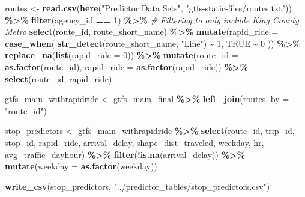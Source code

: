 \documentclass[
  12pt,
]{article}
\newenvironment{Shaded}{\begin{snugshade}}{\end{snugshade}}
\newcommand{\AttributeTok}[1]{\textcolor[rgb]{0.13,0.29,0.53}{#1}}
\newcommand{\CommentTok}[1]{\textcolor[rgb]{0.56,0.35,0.01}{\textit{#1}}}
\newcommand{\ConstantTok}[1]{\textcolor[rgb]{0.56,0.35,0.01}{#1}}
\newcommand{\DecValTok}[1]{\textcolor[rgb]{0.00,0.00,0.81}{#1}}
\newcommand{\FunctionTok}[1]{\textcolor[rgb]{0.13,0.29,0.53}{\textbf{#1}}}
\newcommand{\NormalTok}[1]{#1}
\newcommand{\OtherTok}[1]{\textcolor[rgb]{0.56,0.35,0.01}{#1}}
\newcommand{\SpecialCharTok}[1]{\textcolor[rgb]{0.81,0.36,0.00}{\textbf{#1}}}
\newcommand{\StringTok}[1]{\textcolor[rgb]{0.31,0.60,0.02}{#1}}
\begin{document}
\begin{Shaded}
\begin{Highlighting}[]
\NormalTok{routes }\OtherTok{\textless{}{-}} \FunctionTok{read.csv}\NormalTok{(}\FunctionTok{here}\NormalTok{(}\StringTok{"Predictor Data Sets"}\NormalTok{,}
                        \StringTok{"gtfs{-}static{-}files/routes.txt"}\NormalTok{)) }\SpecialCharTok{\%\textgreater{}\%}
  \FunctionTok{filter}\NormalTok{(agency\_id }\SpecialCharTok{==} \DecValTok{1}\NormalTok{) }\SpecialCharTok{\%\textgreater{}\%} \CommentTok{\# Filtering to only include King County Metro }
  \FunctionTok{select}\NormalTok{(route\_id, route\_short\_name) }\SpecialCharTok{\%\textgreater{}\%}
  \FunctionTok{mutate}\NormalTok{(}\AttributeTok{rapid\_ride =} \FunctionTok{case\_when}\NormalTok{(}
    \FunctionTok{str\_detect}\NormalTok{(route\_short\_name, }\StringTok{"Line"}\NormalTok{) }\SpecialCharTok{\textasciitilde{}} \DecValTok{1}\NormalTok{,}
    \ConstantTok{TRUE} \SpecialCharTok{\textasciitilde{}} \DecValTok{0}
\NormalTok{  )) }\SpecialCharTok{\%\textgreater{}\%}
  \FunctionTok{replace\_na}\NormalTok{(}\FunctionTok{list}\NormalTok{(}\AttributeTok{rapid\_ride =} \DecValTok{0}\NormalTok{)) }\SpecialCharTok{\%\textgreater{}\%}
  \FunctionTok{mutate}\NormalTok{(}\AttributeTok{route\_id =} \FunctionTok{as.factor}\NormalTok{(route\_id),}
         \AttributeTok{rapid\_ride =} \FunctionTok{as.factor}\NormalTok{(rapid\_ride)) }\SpecialCharTok{\%\textgreater{}\%}
  \FunctionTok{select}\NormalTok{(route\_id, rapid\_ride)}

\NormalTok{gtfs\_main\_withrapidride }\OtherTok{\textless{}{-}}\NormalTok{ gtfs\_main\_final }\SpecialCharTok{\%\textgreater{}\%}
  \FunctionTok{left\_join}\NormalTok{(routes,}
            \AttributeTok{by =} \StringTok{"route\_id"}\NormalTok{)}

\NormalTok{stop\_predictors }\OtherTok{\textless{}{-}}\NormalTok{ gtfs\_main\_withrapidride }\SpecialCharTok{\%\textgreater{}\%}
  \FunctionTok{select}\NormalTok{(route\_id, trip\_id, stop\_id, rapid\_ride, arrival\_delay, }
\NormalTok{         shape\_dist\_traveled, weekday, hr, avg\_traffic\_dayhour) }\SpecialCharTok{\%\textgreater{}\%}
  \FunctionTok{filter}\NormalTok{(}\SpecialCharTok{!}\FunctionTok{is.na}\NormalTok{(arrival\_delay)) }\SpecialCharTok{\%\textgreater{}\%}
  \FunctionTok{mutate}\NormalTok{(}\AttributeTok{weekday =} \FunctionTok{as.factor}\NormalTok{(weekday))}

\FunctionTok{write\_csv}\NormalTok{(stop\_predictors, }\StringTok{"../predictor\_tables/stop\_predictors.csv"}\NormalTok{)}
\end{Highlighting}
\end{Shaded}
\end{document}
